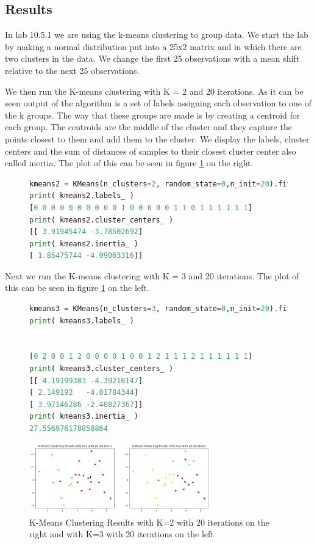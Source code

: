 \subsection{Results}
In lab 10.5.1 we are using the k-means clustering to group data. We start the lab by making a normal distribution put into a 25x2 matrix and in which there are two clusters in the data. We change the first 25 observations with a mean shift relative to the next 25 observations.

We then run the K-means clustering with K = 2 and 20 iterations. As it can be seen output of the algorithm is a set of labels assigning each observation to one of the k groups. The way that these groups are made is by
creating a centroid for each group. The centroids are the middle of the cluster and they capture the points closest to them and add them to the cluster. We display the labels, cluster centers and the sum of distances of samples to their closest cluster center also called inertia. The plot of this can be seen in figure \ref{fig:kmeansclusteringk2_20Iteration} on the right.
\begin{figure}[H]
	\begin{lstlisting}[caption=k-means clustering, label={lst:acpython}, language=Python]
kmeans2 = KMeans(n_clusters=2, random_state=0,n_init=20).fit(X)
print( kmeans2.labels_ )
[0 0 0 0 0 0 0 0 0 0 1 0 0 0 0 0 1 1 0 1 1 1 1 1 1]
print( kmeans2.cluster_centers_ )
[[ 3.91945474 -3.78502692]
print( kmeans2.inertia_ )
[ 1.85475744 -4.09063316]]
	\end{lstlisting}
\end{figure}
Next we run the K-means clustering with K = 3 and 20 iterations. The plot of this can be seen in figure \ref{fig:kmeansclusteringk2_20Iteration} on the left.
\begin{figure}[H]
	\begin{lstlisting}[caption=k-means clustering, label={lst:acpython}, language=Python]
kmeans3 = KMeans(n_clusters=3, random_state=0,n_init=20).fit(X)
print( kmeans3.labels_ )


[0 2 0 0 1 2 0 0 0 0 1 0 0 1 2 1 1 1 2 1 1 1 1 1 1]
print( kmeans3.cluster_centers_ )
[[ 4.19199303 -4.39210147]
[ 2.149192   -4.01784344]
[ 3.97146286 -2.40827367]]
print( kmeans3.inertia_ )
27.556976178858864
	\end{lstlisting}
\end{figure}



\begin{figure}[H]
	\centering
	\includegraphics[width=0.7\textwidth]{clusteringMethods/kmeansclustering/fig/k-mean.png}
	\caption{K-Means Clustering Results with K=2 with 20 iterations on the right and  with K=3 with 20 iterations on the left}
	\label{fig:kmeansclusteringk2_20Iteration}
\end{figure}

